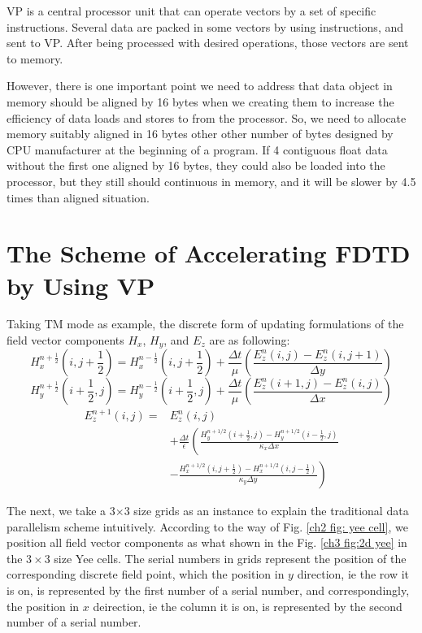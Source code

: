 VP is a central processor unit that can operate vectors by a set of specific instructions. Several data are packed in some vectors by using instructions, and sent to VP. After being processed with desired operations, those vectors are sent to memory.

However, there is one important point we need to address that data object in memory should be aligned by 16 bytes when we creating them to increase the efficiency of data loads and stores to from the processor. So, we need to allocate memory suitably aligned in 16 bytes other other number of bytes designed by CPU manufacturer at the beginning of a program. If 4 contiguous float data without the first one aligned by 16 bytes, they could also be loaded into the processor, but they still should continuous in memory, and it will be slower by 4.5 times than aligned situation.

\section{The Scheme of Accelerating FDTD by Using VP}

Taking TM mode as example, the discrete form of updating formulations of the field vector components $H_x$, $H_y$, and $E_z$ are as following:
\begin{equation}\label{ch3: hx}
H^{n+\frac{1}{2}}_{x}\left(i,j+\frac{1}{2}\right)=H^{n-\frac{1}{2}}_{x}\left(i,j+\frac{1}{2}\right)+
\frac{\Delta t}{\mu}\left(
\frac{E^n_z(i,j)-E^n_z(i,j+1)}{\Delta y}
\right)
\end{equation}
\begin{equation}
H^{n+\frac{1}{2}}_{y}\left(i+\frac{1}{2},j\right)=H^{n-\frac{1}{2}}_{y}\left(i+\frac{1}{2},j\right)+
\frac{\Delta t}{\mu}\left(
\frac{E^n_z(i+1,j)-E^n_z(i,j)}{\Delta x}
\right)
\end{equation}
\begin{equation}\label{ch3: ez}
\begin{split}
E^{n+1}_z(i,j)=&E_z^n(i,j)\\
&+\frac{\Delta t}{\epsilon}\left(
\frac{H_y^{n+1/2}(i+\frac{1}{2},j)-H_y^{n+1/2}(i-\frac{1}{2},j)}{\kappa_x \Delta x}\right.\\
&\left.-\frac{H_x^{n+1/2}(i,j+\frac{1}{2})-H_x^{n+1/2}(i,j-\frac{1}{2})}{\kappa_y \Delta y}
\right)
\end{split}
\end{equation}

The next, we take a 3$\times$3 size grids as an instance to explain the traditional data parallelism scheme intuitively. According to the way of Fig. \ref{ch2 fig: yee cell}, we position all field vector components as what shown in the Fig. \ref{ch3 fig:2d yee} in the $3\times3$ size Yee cells. The serial numbers in grids represent the position of the corresponding discrete field point, which the position in $y$ direction, ie the row it is on, is represented by the first number of a serial number, and correspondingly, the position in $x$ deirection, ie the column it is on, is represented by the second number of a serial number.

